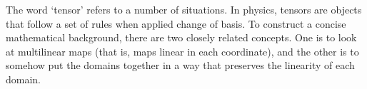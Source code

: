 \label{chap:tensors}

The word `tensor' refers to a number of situations.
In physics, tensors are objects that follow a set of rules
when applied change of basis.
To construct a concise mathematical background,
there are two closely related concepts.
One is to look at multilinear maps
(that is, maps linear in each coordinate),
and the other is to somehow put the domains together
in a way that preserves the linearity of each domain.